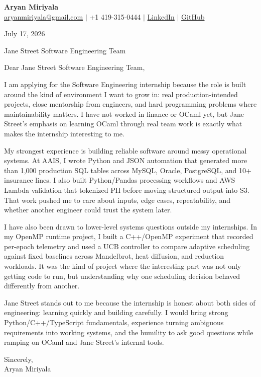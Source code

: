 \documentclass[letterpaper,11pt]{article}
\begin{document}
{\Large\textbf{Aryan Miriyala}}\\
\href{mailto:aryanmiriyala@gmail.com}{aryanmiriyala@gmail.com} $|$ +1 419-315-0444 $|$
\href{https://www.linkedin.com/in/aryan-miriyala-7788a21b6/}{LinkedIn} $|$
\href{https://github.com/aryanmiriyala}{GitHub}

July 17, 2026

Jane Street Software Engineering Team

Dear Jane Street Software Engineering Team,

I am applying for the Software Engineering internship because the role is built around the kind of environment I want to grow in: real production-intended projects, close mentorship from engineers, and hard programming problems where maintainability matters. I have not worked in finance or OCaml yet, but Jane Street's emphasis on learning OCaml through real team work is exactly what makes the internship interesting to me.

My strongest experience is building reliable software around messy operational systems. At AAIS, I wrote Python and JSON automation that generated more than 1,000 production SQL tables across MySQL, Oracle, PostgreSQL, and 10+ insurance lines. I also built Python/Pandas processing workflows and AWS Lambda validation that tokenized PII before moving structured output into S3. That work pushed me to care about inputs, edge cases, repeatability, and whether another engineer could trust the system later.

I have also been drawn to lower-level systems questions outside my internships. In my OpenMP runtime project, I built a C++/OpenMP experiment that recorded per-epoch telemetry and used a UCB controller to compare adaptive scheduling against fixed baselines across Mandelbrot, heat diffusion, and reduction workloads. It was the kind of project where the interesting part was not only getting code to run, but understanding why one scheduling decision behaved differently from another.

Jane Street stands out to me because the internship is honest about both sides of engineering: learning quickly and building carefully. I would bring strong Python/C++/TypeScript fundamentals, experience turning ambiguous requirements into working systems, and the humility to ask good questions while ramping on OCaml and Jane Street's internal tools.

Sincerely,\\
Aryan Miriyala
\end{document}
